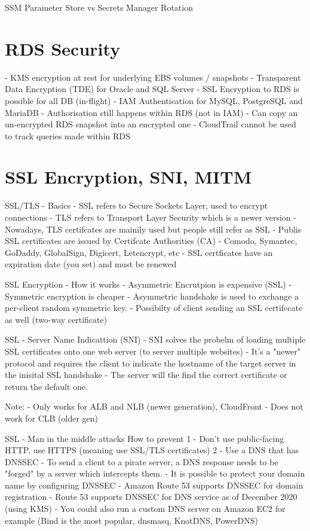 \documentclass[11pt]{book}
\begin{document}
    SSM Parameter Store vs Secrets Manager Rotation

    \section{RDS Security}
    - KMS encryption at rest for underlying EBS volumes / snapshots
    - Transparent Data Encryption (TDE) for Oracle and SQL Server
    - SSL Encryption to RDS is possible for all DB (in-flight)
    - IAM Authentication for MySQL, PostgreSQL and MariaDB
    - Authorisation still happens within RDS (not in IAM)
    - Can copy an un-encrypted RDS snapshot into an encrypted one
    - CloudTrail cannot be used to track queries made within RDS

    \section{SSL Encryption, SNI, MITM}
SSL/TLS - Basics
    - SSL refers to Secure Sockets Layer, used to encrypt connections
    - TLS refers to Transport Layer Security which is a newer version
    - Nowadays, TLS certifcates are mainily used but people still refer as SSL
    - Publis SSL certificates are issued by Certifcate Authorities (CA)
    - Comodo, Symantec, GoDaddy, GlobalSign, Digicert, Letencrypt, etc
    - SSL certficates have an expiration date (you set) and must be renewed

    SSL Encryption - How it works
    - Asymmetric Encrutpion is expensive (SSL)
    - Symmetric encryption is cheaper
    - Asymmetric handshake is used to exchange a per-client random symmetric key.
    - Possibilty of client sending an SSL certifccate as well (two-way certificate)

    SSL - Server Name Indicattion (SNI)
    - SNI solves the probelm of loading multiple SSL certificates onto one web server (to server multiple websites)
    - It's a "newer" protocol and requires the client to indicate the hostname of the target server in the inisital SSL handshake
    - The server will the find the correct certificate or return the default one.

    Note:
    - Only works for ALB and NLB (newer generation), CloudFront
    - Does not work for CLB (older gen)

    SSL - Man in the middle attacks
    How to prevent
    1 - Don't use public-facing HTTP, use HTTPS (meaning use SSL/TLS certificates)
    2 - Use a DNS that has DNSSEC
    - To send a client to a pirate server, a DNS response needs to be "forged" by a server which intercepts them.
    - It is possible to protect your domain name by configuring DNSSEC
    - Amazon Route 53 supports DNSSEC for domain registration
    - Route 53 supports DNSSEC for DNS service as of December 2020 (using KMS)
    - You could also run a custom DNS server on Amazon EC2 for example (Bind is the most popular, dnsmasq, KnotDNS, PowerDNS)
\end{document}
